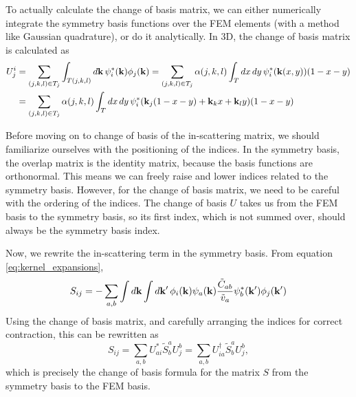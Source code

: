 \documentclass[12pt]{article}
\begin{document}
To actually calculate the change of basis matrix, we can either numerically integrate the symmetry
basis functions over the FEM elements (with a method like Gaussian quadrature), or do it
analytically. In 3D, the change of basis matrix is calculated as
\begin{align}
    U^i_j &= \sum_{(j,k,l) \in T_j} \int_{T(j,k,l)} \dd{\vb{k}} \psi_i^*(\vb{k}) \phi_j(\vb{k})
    = \sum_{(j,k,l) \in T_j} \alpha(j,k,l) \int_T \dd{x} \dd{y} \psi_i^*(\vb{k}(x,y))(1-x-y)
    \\ &= \sum_{(j,k,l) \in T_j} \alpha(j,k,l) \int_T \dd{x} \dd{y}
    \psi_i^*(\vb{k}_j(1-x-y) + \vb{k}_k x + \vb{k}_l y)(1-x-y)
\end{align}

Before moving on to change of basis of the in-scattering matrix, we should familiarize ourselves
with the positioning of the indices. In the symmetry basis, the overlap matrix is the identity
matrix, because the basis functions are orthonormal. This means we can freely raise and lower
indices related to the symmetry basis. However, for the change of basis matrix, we need to be
careful with the ordering of the indices. The change of basis $U$ takes us from the FEM basis
to the symmetry basis, so its first index, which is not summed over, should always be the
symmetry basis index.

Now, we rewrite the in-scattering term in the symmetry basis. From equation
\eqref{eq:kernel_expansions},
\begin{equation}
    S_{ij} = -\sum_{a,b} \int\dd{\vb{k}} \int\dd{\vb{k'}}\phi_i(\vb{k})\psi_a(\vb{k})
    \frac{\tilde{C}_{ab}}{\tilde{v}_a}\psi_b^*(\vb{k'})\phi_j(\vb{k'})
    \label{eq:in_scattering_symmetry}
\end{equation}
Using the change of basis matrix, and carefully arranging the indices for correct contraction,
this can be rewritten as
\begin{equation}
    S_{ij} = \sum_{a,b} U^*_{ai} \tilde{S}^a_b U^b_j
    = \sum_{a,b} U^\dagger_{ia} \tilde{S}^a_b U^b_j,
\end{equation}
which is precisely the change of basis formula for the matrix $S$ from the symmetry basis to
the FEM basis.
\end{document}
